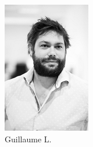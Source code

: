 \begin{figure}[h!]
\begin{subfigure}[b]{0.2\textwidth}
                \includegraphics[width=\textwidth]{images/guillaume-serieux.png}
                \caption{Guillaume L.}
            \end{subfigure}
            \begin{subfigure}[b]{0.2\textwidth}

\end{subfigure}
\end{figure}
